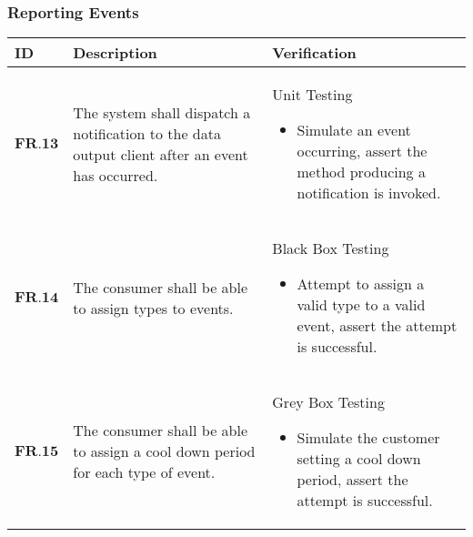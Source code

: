 \subsubsection{Reporting Events}
\begin{longtable}[H]{| p{1.5cm}| p{4.5cm}| p{10.5cm}|}
        \hline
        \cellcolor{titleColor}\textbf{ID}    & \cellcolor{titleColor}\textbf{Description}                                                                                                                                              & \cellcolor{titleColor}\textbf{Verification}                                                                                                                                                                                                                                                                                                                                      \\ \hline
        $\textbf{FR.13}$ & The system shall dispatch a notification to the data output client after an event has occurred.                                                                  & Unit Testing\begin{itemize}\item Simulate an event occurring, assert the method producing a notification is invoked.\end{itemize}                                                                                                                                                                                                               \\ \hline
        $\textbf{FR.14}$ & The consumer shall be able to assign types to events.                                                                                                            & Black Box Testing\begin{itemize}\item Attempt to assign a valid type to a valid event, assert the attempt is successful.\end{itemize}                                                                                                                                                                                                                \\ \hline
        $\textbf{FR.15}$ & The consumer shall be able to assign a cool down period for each type of event.                                                                                  & Grey Box Testing\begin{itemize}\item Simulate the customer setting a cool down period, assert the attempt is successful.\end{itemize}                                                                                                                                                                                                                \\ \hline

\end{longtable}
